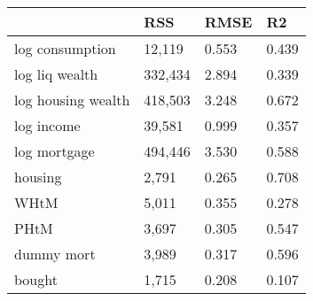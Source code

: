 \begin{table}[htbp]
	\centering
\begin{tabular}{llll} \hline \hline
 & RSS  & RMSE  & R2  \\  \hline 
log consumption &    12,119 &     0.553 &     0.439 \\  
log liq wealth &   332,434 &     2.894 &     0.339 \\  
log housing wealth &   418,503 &     3.248 &     0.672 \\  
log income &    39,581 &     0.999 &     0.357 \\  
log mortgage &   494,446 &     3.530 &     0.588 \\  
housing &     2,791 &     0.265 &     0.708 \\  
WHtM &     5,011 &     0.355 &     0.278 \\  
PHtM &     3,697 &     0.305 &     0.547 \\  
dummy mort &     3,989 &     0.317 &     0.596 \\  
bought &     1,715 &     0.208 &     0.107 \\  
\hline \hline \end{tabular}
\end{table}


